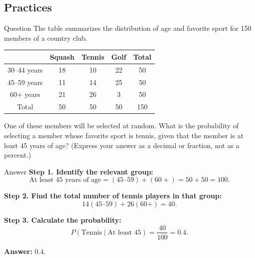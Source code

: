 \documentclass{beamer}
\begin{document}
\begin{frame}
\section{Practices}
\end{frame}


\begin{frame}{Question}
The table summarizes the distribution of age and favorite sport for 150 members of a country club.

\begin{center}
\begin{tabular}{|c|c|c|c|c|}
\hline
 & Squash & Tennis & Golf & Total \\
\hline
30–44 years & 18 & 10 & 22 & 50 \\
45–59 years & 11 & 14 & 25 & 50 \\
60+ years & 21 & 26 & 3 & 50 \\
\hline
Total & 50 & 50 & 50 & 150 \\
\hline
\end{tabular}
\end{center}

One of these members will be selected at random. What is the probability of selecting a member whose favorite sport is tennis, given that the member is at least 45 years of age? (Express your answer as a decimal or fraction, not as a percent.)
\end{frame}
\begin{frame}{Answer}
\textbf{Step 1. Identify the relevant group:}
\[
\text{At least 45 years of age} = (45–59) + (60+) = 50 + 50 = 100.
\]

\textbf{Step 2. Find the total number of tennis players in that group:}
\[
14 (\text{45–59}) + 26 (\text{60+}) = 40.
\]

\textbf{Step 3. Calculate the probability:}
\[
P(\text{Tennis} \mid \text{At least 45}) = \frac{40}{100} = 0.4.
\]

\textbf{Answer:} $\boxed{0.4}$.
\end{frame}
\end{document}
